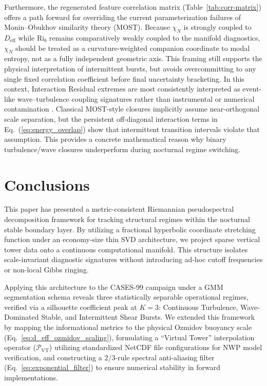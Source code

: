 \documentclass[11pt,a4paper]{article}
\begin{document}
Furthermore, the regenerated feature correlation matrix (Table~\ref{tab:corr-matrix}) offers a path forward for overriding the current parameterization failures of Monin--Obukhov similarity theory (MOST). Because $\chi_N$ is strongly coupled to $D_{\mathrm{eff}}$ while $\mathrm{Ri}_b$ remains comparatively weakly coupled to the manifold diagnostics, $\chi_N$ should be treated as a curvature-weighted companion coordinate to modal entropy, not as a fully independent geometric axis. This framing still supports the physical interpretation of intermittent bursts, but avoids overcommitting to any single fixed correlation coefficient before final uncertainty bracketing. In this context, Interaction Residual extremes are most consistently interpreted as event-like wave--turbulence coupling signatures rather than instrumental or numerical contamination \citep{Sun2015, Mahrt2010}.
Classical MOST-style closures implicitly assume near-orthogonal scale separation, but the persistent off-diagonal interaction terms in Eq.~(\ref{eq:energy_overlap}) show that intermittent transition intervals violate that assumption. This provides a concrete mathematical reason why binary turbulence/wave closures underperform during nocturnal regime switching.

 \section{Conclusions}
\label{sec:conclusions}

This paper has presented a metric-consistent Riemannian pseudospectral decomposition framework for tracking structural regimes within the nocturnal stable boundary layer. By utilizing a fractional hyperbolic coordinate stretching function under an economy-size thin SVD architecture, we project sparse vertical tower data onto a continuous computational manifold. This structure isolates scale-invariant diagnostic signatures without introducing ad-hoc cutoff frequencies or non-local Gibbs ringing.

Applying this architecture to the CASES-99 campaign under a GMM segmentation schema reveals three statistically separable operational regimes, verified via a silhouette coefficient peak at $K=3$: Continuous Turbulence, Wave-Dominated Stable, and Intermittent Shear Bursts. We extended this framework by mapping the informational metrics to the physical Ozmidov buoyancy scale (Eq.~\ref{eq:d_eff_ozmidov_scaling}), formulating a ``Virtual Tower'' interpolation operator ($\mathcal{P}_{\mathrm{VT}}$) utilizing standardized NetCDF file configurations for NWP model verification, and constructing a $2/3$-rule spectral anti-aliasing filter (Eq.~\ref{eq:exponential_filter}) to ensure numerical stability in forward implementations.
\end{document}

